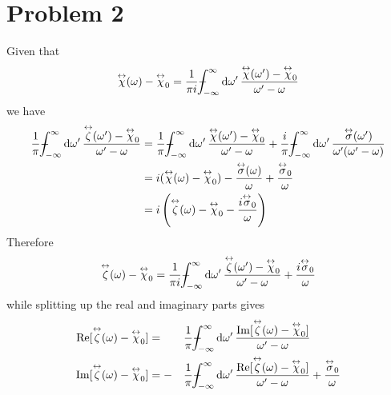 \documentclass[12pt]{article}
\newcommand{\tens}[1]{\overset{\leftrightarrow}{#1}}
\def\Xint#1{\mathchoice
   {\XXint\displaystyle\textstyle{#1}}%
   {\XXint\textstyle\scriptstyle{#1}}%
   {\XXint\scriptstyle\scriptscriptstyle{#1}}%
   {\XXint\scriptscriptstyle\scriptscriptstyle{#1}}%
   \!\int}
\def\XXint#1#2#3{{\setbox0=\hbox{$#1{#2#3}{\int}$}
     \vcenter{\hbox{$#2#3$}}\kern-.5\wd0}}
\def\dashint{\Xint-}
\newcommand{\fulldashintd}[1]{\dashint_{-\infty}^{\infty}\dd{#1}}
\begin{document}
\section*{Problem 2}
Given that 
\[ \tens{\chi}(\omega) - \tens{\chi}_0 = \frac{1}{\pi i} \dashint_{-\infty}^{\infty}\dd{\omega'} \frac{\tens{\chi}(\omega')-\tens{\chi}_0}{\omega' - \omega} \]
we have
\begin{align*}
    \frac{1}{\pi}\fulldashintd{\omega'} \frac{\tens{\zeta}(\omega') - \tens{\chi}_0}{\omega' - \omega} &= \frac{1}{\pi}\fulldashintd{\omega'}\frac{\tens{\chi}(\omega') - \tens{\chi}_0}{\omega' - \omega} + \frac{i}{\pi}\fulldashintd{\omega'}\frac{\tens{\sigma}(\omega')}{\omega'(\omega' - \omega)} \\
    &= i(\tens{\chi}(\omega) - \tens{\chi}_0) - \frac{\tens{\sigma}(\omega)}{\omega} + \frac{\tens{\sigma}_0}{\omega} \\
    &= i\left(\tens{\zeta}(\omega) - \tens{\chi}_0 - \frac{i\tens{\sigma}_0}{\omega}\right)
\end{align*}
Therefore
\[ \tens{\zeta}(\omega) - \tens{\chi}_0 = \frac{1}{\pi i}\fulldashintd{\omega'}\frac{\tens{\zeta}(\omega') - \tens{\chi}_0}{\omega' - \omega} + \frac{i\tens{\sigma}_0}{\omega} \]
while splitting up the real and imaginary parts gives
\begin{alignat*}{2}
    \Re[\tens{\zeta}(\omega) - \tens{\chi}_0] &= &&\frac{1}{\pi}\fulldashintd{\omega'}\frac{\Im[\tens{\zeta}(\omega) - \tens{\chi}_0]}{\omega' - \omega} \\
    \Im[\tens{\zeta}(\omega) - \tens{\chi}_0] &= -&&\frac{1}{\pi}\fulldashintd{\omega'}\frac{\Re[\tens{\zeta}(\omega) - \tens{\chi}_0]}{\omega' - \omega}  + \frac{\tens{\sigma}_0}{\omega}
\end{alignat*}
\end{document}
